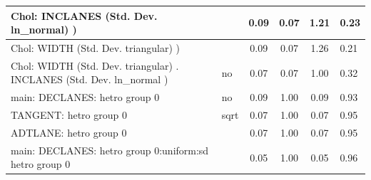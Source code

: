 \begin{table}
\begin{center}
\begin{tabular}{|l|l|c|c|c|l|}
			\hline
			 Chol: INCLANES (Std. Dev. ln_normal) ) &  & 0.09 & 0.07 & 1.21 & 0.23 \\
			\hline
			 Chol: WIDTH (Std. Dev. triangular) ) &  & 0.09 & 0.07 & 1.26 & 0.21 \\
			\hline
			 Chol: WIDTH (Std. Dev. triangular) . INCLANES (Std. Dev.   ln_normal ) & no & 0.07 & 0.07 & 1.00 & 0.32 \\
			\hline
			main: DECLANES: hetro group 0 & no & 0.09 & 1.00 & 0.09 & 0.93 \\
			\hline
			TANGENT: hetro group 0 & sqrt & 0.07 & 1.00 & 0.07 & 0.95 \\
			\hline
			ADTLANE: hetro group 0 &  & 0.07 & 1.00 & 0.07 & 0.95 \\
			\hline
			main: DECLANES: hetro group 0:uniform:sd  hetro group 0 &  & 0.05 & 1.00 & 0.05 & 0.96 \\
			\hline
		\end{tabular}
	\end{center}
\end{table}